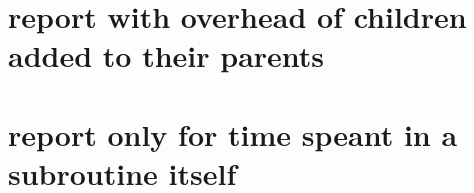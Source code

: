 \begin{appendices}
    \section{ report with overhead of children added to their parents}
        
    \section{ report only for time speant in a subroutine itself}
        

\end{appendices}
